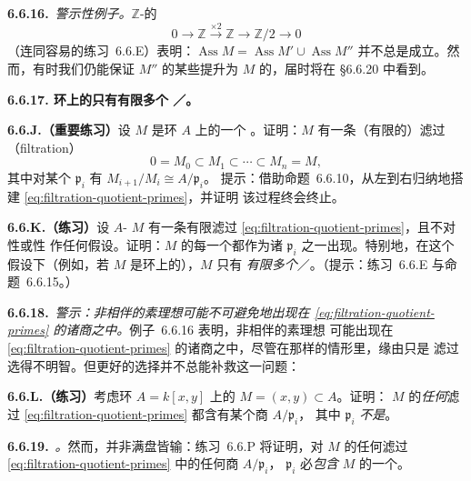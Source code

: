 \textbf{6.6.16.}\ \emph{警示性例子。}\quad $\mathbb{Z}$-\trModule{}的\trShortExactSequence
\[
0\longrightarrow\mathbb{Z}\xrightarrow{\times 2}\mathbb{Z}
  \longrightarrow\mathbb{Z}/2\longrightarrow 0
\]
（连同容易的练习~6.6.E）表明：$\operatorname{Ass}M=\operatorname{Ass}M'\cup\operatorname{Ass}M''$
并不总是成立。然而，有时我们仍能保证 $M''$ 的某些\trAssociatedPrimeIdeal{}提升为 $M$ 的\trAssociatedPrimeIdeal{}，届时将在
\S6.6.20 中看到。

\textbf{6.6.17. \trNoetherian{}环上的\trFinitelyGenerated{}\trModule{}只有有限多个%
\trAssociatedPoint{}／\trAssociatedPrimeIdeal{}。}

\textbf{6.6.J.（重要练习）}\quad 设 $M$ 是\trNoetherian{}环 $A$ 上的一个\trFinitelyGenerated{}%
\trModule。证明：$M$ 有一条（有限的）滤过（filtration）
\begin{equation*}\tag{6.6.17.1}\label{eq:filtration-quotient-primes}
0=M_0\subset M_1\subset\cdots\subset M_n=M,
\end{equation*}
其中对某个\trPrimeIdeal{} $\mathfrak{p}_i$ 有 $M_{i+1}/M_i\cong A/\mathfrak{p}_i$。
提示：借助命题~6.6.10，从左到右归纳地搭建 \eqref{eq:filtration-quotient-primes}，并证明
该过程终会终止。

\textbf{6.6.K.（练习）}\quad 设 $A$-\trModule{} $M$ 有一条有限滤过%
\eqref{eq:filtration-quotient-primes}，且不对\trFinitelyGenerated{}性或\trNoetherian{}性
作任何假设。证明：$M$ 的每一个\trAssociatedPrimeIdeal{}都作为诸 $\mathfrak{p}_i$ 之一出现。特别地，在这个
假设下（例如，若 $M$ 是\trNoetherian{}环上的\trFinitelyGenerated{}\trModule），$M$ 只有%
\emph{有限多个}\trAssociatedPoint{}／\trAssociatedPrimeIdeal{}。（提示：练习~6.6.E 与命题~6.6.15。）

\textbf{6.6.18.}\ \emph{警示：非相伴的素理想可能不可避免地出现在%
\eqref{eq:filtration-quotient-primes} 的诸商之中。}\quad 例子~6.6.16 表明，非相伴的素理想
可能出现在 \eqref{eq:filtration-quotient-primes} 的诸商之中，尽管在那样的情形里，缘由只是
滤过选得不明智。但更好的选择并不总能补救这一问题：

\textbf{6.6.L.（练习）}\quad 考虑环 $A=k[x,y]$ 上的\trModule{} $M=(x,y)\subset A$。证明：
$M$ 的\emph{任何}滤过 \eqref{eq:filtration-quotient-primes} 都含有某个商 $A/\mathfrak{p}_i$，
其中 $\mathfrak{p}_i$ \emph{不是}\trAssociatedPrimeIdeal{}。

\textbf{6.6.19.}\ \emph{\trhRemark{}。}\quad 然而，并非满盘皆输：练习~6.6.P 将证明，对
$M$ 的任何滤过 \eqref{eq:filtration-quotient-primes} 中的任何商 $A/\mathfrak{p}_i$，
$\mathfrak{p}_i$ 必\emph{包含} $M$ 的一个\trAssociatedPrimeIdeal{}。

